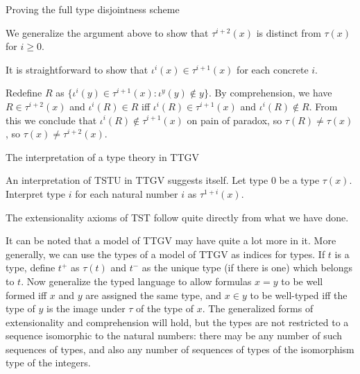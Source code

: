 \documentclass{slides}
\begin{document}
\begin{slide}


{\Large Proving the full type disjointness scheme}

We generalize the argument above to show that $\tau^{i+2}(x)$ is distinct from $\tau(x)$ for $i \geq 0$.

It is straightforward to show that $\iota^i(x) \in \tau^{i+1}(x)$ for each concrete $i$.

Redefine $R$ as $\{\iota^i(y) \in \tau^{i+1}(x):\iota^y(y)\not\in y\}$.  By comprehension, we have $R \in \tau^{i+2}(x)$ and $\iota^i(R) \in R$ iff $\iota^i(R) \in \tau^{i+1}(x)$ and $\iota^i(R) \not\in R$.
From this we conclude that $\iota^i(R) \not\in \tau^{i+1}(x)$ on pain of paradox, so $\tau(R) \neq \tau(x)$, so $\tau(x) \neq \tau^{i+2}(x)$.


\begin{slide}
{\Large The interpretation of a type theory in TTGV}

An interpretation of TSTU in TTGV suggests itself.  Let type 0 be a type $\tau(x)$.  Interpret type $i$ for each natural number $i$ as $\tau^{1+i}(x)$.

The extensionality axioms of TST follow quite directly from what we have done.

It can be noted that a model of TTGV may have quite a lot more in it.   More generally, we can use the types of a model of TTGV as indices for types.  If $t$ is a type, define $t^+$ as $\tau(t)$ and $t^-$ as the unique type (if there is one) which belongs to $t$.
Now generalize the typed language to allow formulas $x = y$ to be well formed iff $x$ and $y$ are assigned the same type, and $x \in y$ to be well-typed iff the type of $y$ is the image under $\tau$ of the type of $x$.
The generalized forms of extensionality and comprehension will hold, but the types are not restricted to a sequence isomorphic to the natural numbers:  there may be any number of such sequences of types, and also any number of sequences of types of the isomorphism type of the integers.


\end{slide}





\end{slide}
\end{document}
